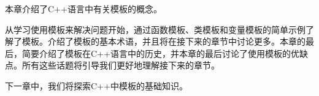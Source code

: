 本章介绍了C++语言中有关模板的概念。

从学习使用模板来解决问题开始，通过函数模板、类模板和变量模板的简单示例了解了模板。介绍了模板的基本术语，并且将在接下来的章节中讨论更多。本章的最后，简要介绍了模板在C++语言中的历史，并本章的最后讨论了使用模板的优缺点。所有这些话题将引导我们更好地理解接下来的章节。

下一章中，我们将探索C++中模板的基础知识。